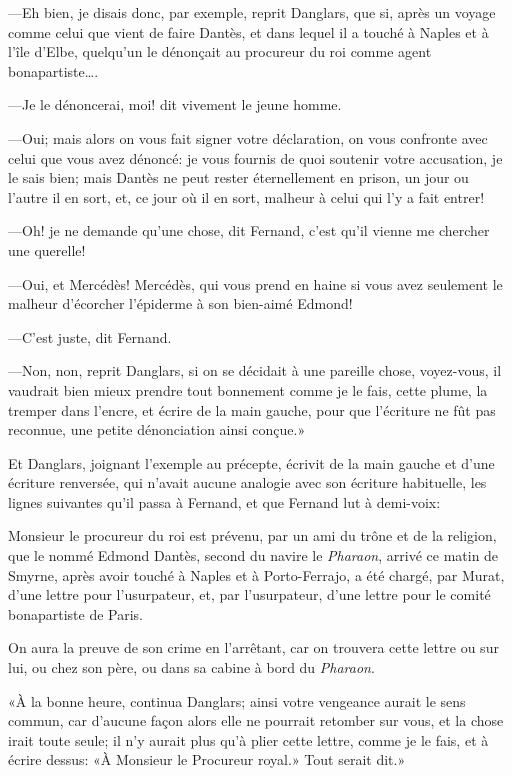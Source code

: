 —Eh bien, je disais donc, par exemple, reprit Danglars, que si, après un voyage comme celui que vient de faire Dantès, et dans lequel il a touché à Naples et à l'île d'Elbe, quelqu'un le dénonçait au procureur du roi comme agent bonapartiste\dots.

—Je le dénoncerai, moi! dit vivement le jeune homme.

—Oui; mais alors on vous fait signer votre déclaration, on vous confronte avec celui que vous avez dénoncé: je vous fournis de quoi soutenir votre accusation, je le sais bien; mais Dantès ne peut rester éternellement en prison, un jour ou l'autre il en sort, et, ce jour où il en sort, malheur à celui qui l'y a fait entrer!

—Oh! je ne demande qu'une chose, dit Fernand, c'est qu'il vienne me chercher une querelle!

—Oui, et Mercédès! Mercédès, qui vous prend en haine si vous avez seulement le malheur d'écorcher l'épiderme à son bien-aimé Edmond!

—C'est juste, dit Fernand.

—Non, non, reprit Danglars, si on se décidait à une pareille chose, voyez-vous, il vaudrait bien mieux prendre tout bonnement comme je le fais, cette plume, la tremper dans l'encre, et écrire de la main gauche, pour que l'écriture ne fût pas reconnue, une petite dénonciation ainsi conçue.»

Et Danglars, joignant l'exemple au précepte, écrivit de la main gauche et d'une écriture renversée, qui n'avait aucune analogie avec son écriture habituelle, les lignes suivantes qu'il passa à Fernand, et que Fernand lut à demi-voix:

\begin{mail}{}{}
Monsieur le procureur du roi est prévenu, par un ami du trône et de la religion, que le nommé Edmond Dantès, second du navire le \textit{Pharaon}, arrivé ce matin de Smyrne, après avoir touché à Naples et à Porto-Ferrajo, a été chargé, par Murat, d'une lettre pour l'usurpateur, et, par l'usurpateur, d'une lettre pour le comité bonapartiste de Paris.

On aura la preuve de son crime en l'arrêtant, car on trouvera cette lettre ou sur lui, ou chez son père, ou dans sa cabine à bord du \textit{Pharaon}.
\end{mail}

«À la bonne heure, continua Danglars; ainsi votre vengeance aurait le sens commun, car d'aucune façon alors elle ne pourrait retomber sur vous, et la chose irait toute seule; il n'y aurait plus qu'à plier cette lettre, comme je le fais, et à écrire dessus: «À Monsieur le Procureur royal.» Tout serait dit.»

